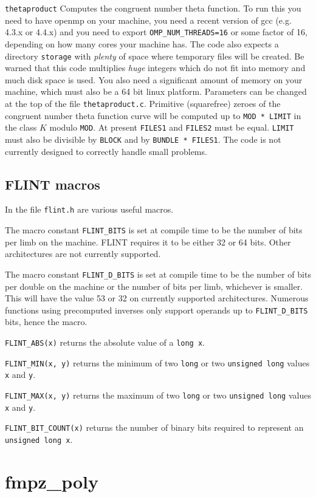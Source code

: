 \documentclass[a4paper,10pt]{book}
\newcommand{\code}{\lstinline}
\begin{document}
\code{thetaproduct}  Computes the congruent number theta function.  To run 
this you need to have openmp on your machine, you need a recent version of 
gcc (e.g. 4.3.x or 4.4.x) and you need to export \code{OMP_NUM_THREADS=16} 
or some factor of 16, depending on how many cores your machine has.  The 
code also expects a directory \code{storage} with \emph{plenty} of space 
where temporary files will be created.  Be warned that this code multiplies 
\emph{huge} integers which do not fit into memory and much disk space is 
used.  You also need a significant amount of memory on your machine, which 
must also be a 64 bit linux platform.  Parameters can be changed at the top 
of the file \code{thetaproduct.c}.  Primitive (squarefree) zeroes of the 
congruent number theta function curve will be computed up to 
\code{MOD * LIMIT} in the class $K$ modulo \code{MOD}.  At present 
\code{FILES1} and \code{FILES2} must be equal.  \code{LIMIT} must also be 
divisible by \code{BLOCK} and by \code{BUNDLE * FILES1}.  The code is not 
currently designed to correctly handle small problems. 

\section{FLINT macros}

In the file \code{flint.h} are various useful macros.

The macro constant \code{FLINT_BITS} is set at compile time to be the 
number of bits per limb on the machine.  FLINT requires it to be either 
32 or 64 bits.  Other architectures are not currently supported.

The macro constant \code{FLINT_D_BITS} is set at compile time to be the 
number of bits per double on the machine or the number of bits per limb, 
whichever is smaller.  This will have the value 53 or 32 on currently 
supported architectures.  Numerous functions using precomputed inverses 
only support operands up to \code{FLINT_D_BITS} bits, hence the macro.

\code{FLINT_ABS(x)} returns the absolute value of a \code{long x}.

\code{FLINT_MIN(x, y)} returns the minimum of two \code{long} or two 
\code{unsigned long} values \code{x} and \code{y}.

\code{FLINT_MAX(x, y)} returns the maximum of two \code{long} or two 
\code{unsigned long} values \code{x} and \code{y}.

\code{FLINT_BIT_COUNT(x)} returns the number of binary bits required 
to represent an \code{unsigned long x}.

\chapter{fmpz\_poly}




\backmatter
\end{document}
